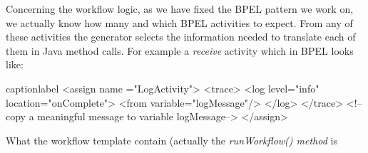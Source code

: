 Concerning the workflow logic, as we have fixed the BPEL pattern we work on, we actually know how many and which BPEL activities to expect. From any of these activities the generator selects the information needed to translate each of them in Java method calls. 
For example a \textit{receive} activity which in BPEL looks like:

\begin{workflow-code}{caption}{label}
<assign name ="LogActivity">
        <trace>
                <log level="info" location="onComplete">
                        <from variable="logMessage"/>
                </log>
        </trace>
        <!--copy a meaningful message to variable logMessage-->
</assign>
\end{workflow-code}

What the workflow template contain (actually the \textit{runWorkflow() method} is   

